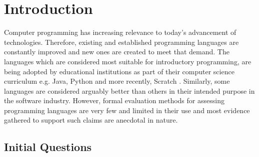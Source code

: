 \chapter{Introduction}
\label{chap:introduction}

Computer programming has increasing relevance to today's advancement of technologies. Therefore, existing and established programming languages are constantly improved and new ones are created to meet that demand. The languages which are considered most suitable for introductory programming, are being adopted by educational institutions as part of their computer science curriculum e.g. Java, Python and more recently, Scratch  . Similarly, some languages are considered arguably better than others in their intended purpose in the software industry. However, formal evaluation methods for assessing programming languages are very few and limited in their use and most evidence gathered to support such claims are anecdotal in nature. 





\section{Initial Questions}



